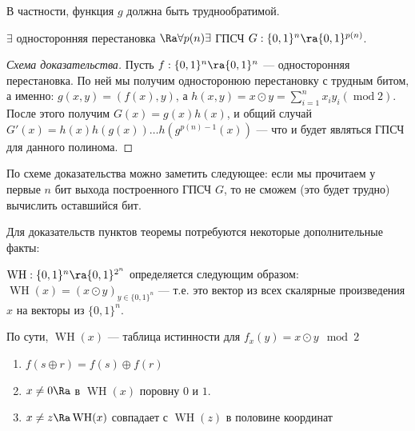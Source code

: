 \begin{note}
    В частности, функция \(g\) должна быть труднообратимой.
\end{note}

\begin{theorem}
    \(\exists\) односторонняя перестановка \(\Ra \forall p(n) \exists\) ГПСЧ \(G: \{0, 1\}^n \ra \{0, 1\}^{p(n)}\).
\end{theorem}
\begin{proof}[Схема доказательства]
    Пусть \(f: \{0, 1\}^n \ra \{0, 1\}^n\) --- односторонняя перестановка. По ней мы получим односторонюю перестановку с трудным битом, а именно: \(g(x, y) = (f(x), y)\), а \(h(x, y) = x \odot y = \sum_{i = 1}^n x_iy_i(\operatorname{mod} 2)\). После этого получим \(G(x) = g(x)h(x)\), и общий случай \(G'(x) = h(x)h(g(x))\dots h(g^{p(n) - 1}(x))\) --- что и будет являться ГПСЧ для данного полинома.
\end{proof}

\begin{note}
    По схеме доказательства можно заметить следующее: если мы прочитаем у первые \(n\) бит выхода построенного ГПСЧ \(G\), то не сможем (это будет трудно) вычислить оставшийся бит.
\end{note}

Для доказательств пунктов теоремы потребуются некоторые дополнительные факты:

\begin{definition}
    \(\operatorname{WH}: \{0, 1\}^n \ra \{0, 1\}^{2^n}\) определяется следующим образом: \(\operatorname{WH}(x) = (x \odot y)_{y \in \{0, 1\}^n}\) --- т.е. это вектор из всех скалярные произведения \(x\) на векторы из \(\{0, 1\}^n\).
\end{definition}

\begin{note}
    По сути, \(\operatorname{WH}(x)\) --- таблица истинности для \(f_x(y) = x \odot y \mod 2\)
\end{note}

\begin{note}
    \begin{enumerate}
        \item \(f(s \oplus r) = f(s) \oplus f(r)\)
        \item \(x \ne 0 \Ra\) в \(\operatorname{WH}(x)\) поровну \(0\) и \(1\).
        \item \(x \ne z \Ra \operatorname{WH}(x)\) совпадает с \(\operatorname{WH}(z)\) в половине координат
    \end{enumerate}
\end{note}

